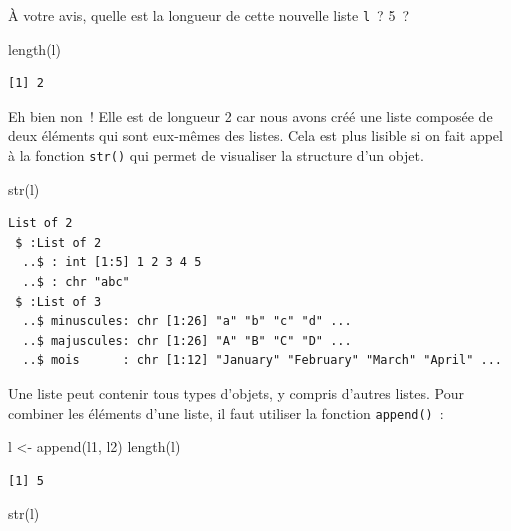 \documentclass[
  letterpaper,
  DIV=11,
  numbers=noendperiod,
  oneside]{scrreprt}
\newenvironment{Shaded}{\begin{snugshade}}{\end{snugshade}}
\newcommand{\FunctionTok}[1]{\textcolor[rgb]{0.28,0.35,0.67}{#1}}
\newcommand{\NormalTok}[1]{\textcolor[rgb]{0.00,0.23,0.31}{#1}}
\newcommand{\OtherTok}[1]{\textcolor[rgb]{0.00,0.23,0.31}{#1}}
\begin{document}
À votre avis, quelle est la longueur de cette nouvelle liste
\texttt{l}~? 5~?

\begin{Shaded}
\begin{Highlighting}[]
\FunctionTok{length}\NormalTok{(l)}
\end{Highlighting}
\end{Shaded}

\begin{verbatim}
[1] 2
\end{verbatim}

Eh bien non~! Elle est de longueur 2 car nous avons créé une liste
composée de deux éléments qui sont eux-mêmes des listes. Cela est plus
lisible si on fait appel à la fonction \texttt{str()} qui permet de
visualiser la structure d'un objet.

\begin{Shaded}
\begin{Highlighting}[]
\FunctionTok{str}\NormalTok{(l)}
\end{Highlighting}
\end{Shaded}

\begin{verbatim}
List of 2
 $ :List of 2
  ..$ : int [1:5] 1 2 3 4 5
  ..$ : chr "abc"
 $ :List of 3
  ..$ minuscules: chr [1:26] "a" "b" "c" "d" ...
  ..$ majuscules: chr [1:26] "A" "B" "C" "D" ...
  ..$ mois      : chr [1:12] "January" "February" "March" "April" ...
\end{verbatim}

Une liste peut contenir tous types d'objets, y compris d'autres listes.
Pour combiner les éléments d'une liste, il faut utiliser la fonction
\texttt{append()}~:

\begin{Shaded}
\begin{Highlighting}[]
\NormalTok{l }\OtherTok{\textless{}{-}} \FunctionTok{append}\NormalTok{(l1, l2)}
\FunctionTok{length}\NormalTok{(l)}
\end{Highlighting}
\end{Shaded}

\begin{verbatim}
[1] 5
\end{verbatim}

\begin{Shaded}
\begin{Highlighting}[]
\FunctionTok{str}\NormalTok{(l)}
\end{Highlighting}
\end{Shaded}
\end{document}
